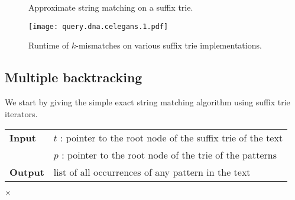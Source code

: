 \begin{figure}[h]
\begin{center}
\caption{Approximate string matching on a suffix trie.}
\label{fig:st-hamming}

\end{center}
\end{figure}

\begin{figure}[h]
\begin{center}
\caption[$k$-mismatches runtime]{Runtime of $k$-mismatches on various suffix trie implementations.}
\label{fig:query-dna-apx}
\texttt{[image: query.dna.celegans.1.pdf]}
\end{center}
\end{figure}


\subsection{Multiple backtracking}

We start by giving the simple exact string matching algorithm using suffix trie iterators.

\begin{center}
\begin{minipage}[t]{.8\textwidth}
\begin{algorithm}[H]
\begin{tabular}{ll}
\textbf{Input}  & $t$ : pointer to the root node of the suffix trie of the text\\
 			    & $p$ : pointer to the root node of the trie of the patterns\\
\textbf{Output} & list of all occurrences of any pattern in the text\\
\end{tabular}
\begin{algorithmic}[1]
	\State \Report {} $\times$ 
\Else
	\State {}
	\Repeat
			\State {}
			\State {}
		\EndIf
\EndIf
\end{algorithmic}
\label{alg:st-exact-multi}
\end{algorithm}
\end{minipage}
\end{center}

